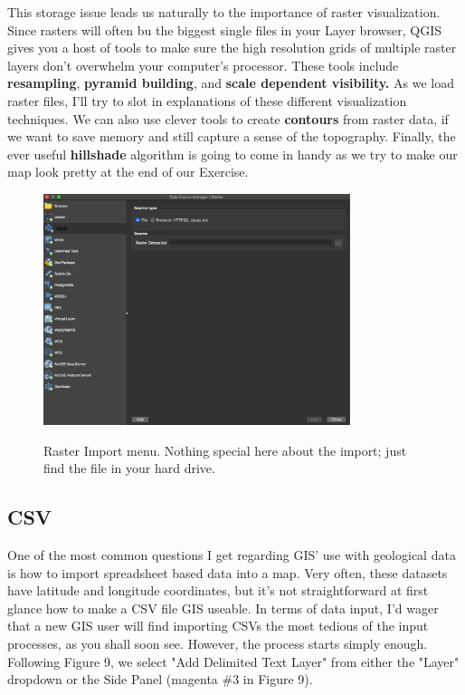 \documentclass{article}
\begin{document}
This storage issue leads us naturally to the importance of raster visualization. Since rasters will often bu the biggest single files in your Layer browser, QGIS gives you a host of tools to make sure the high resolution grids of multiple raster layers don't overwhelm your computer's processor. These tools include \textbf{resampling}, \textbf{pyramid building}, and \textbf{scale dependent visibility.} As we load raster files, I'll try to slot in explanations of these different visualization techniques. We can also use clever tools to create \textbf{contours} from raster data, if we want to save memory and still capture a sense of the topography. Finally, the ever useful \textbf{hillshade} algorithm is going to come in handy as we try to make our map look pretty at the end of our Exercise. 

\begin{figure}[htbp]
    \centering
    \includegraphics[width=0.8\textwidth]{Fig_12_Raster.png}
    \label{fig12}
    \caption{Raster Import menu. Nothing special here about the import; just find the file in your hard drive.}
\end{figure}

\subsection{CSV}

One of the most common questions I get regarding GIS' use with geological data is how to import spreadsheet based data into a map. Very often, these datasets have latitude and longitude coordinates, but it's not straightforward at first glance how to make a CSV file GIS useable. In terms of data input, I'd wager that a new GIS user will find importing CSVs the most tedious of the input processes, as you shall soon see. However, the process starts simply enough. Following Figure 9, we select "Add Delimited Text Layer" from either the "Layer" dropdown or the Side Panel (magenta \#3 in Figure 9). 
\end{document}
